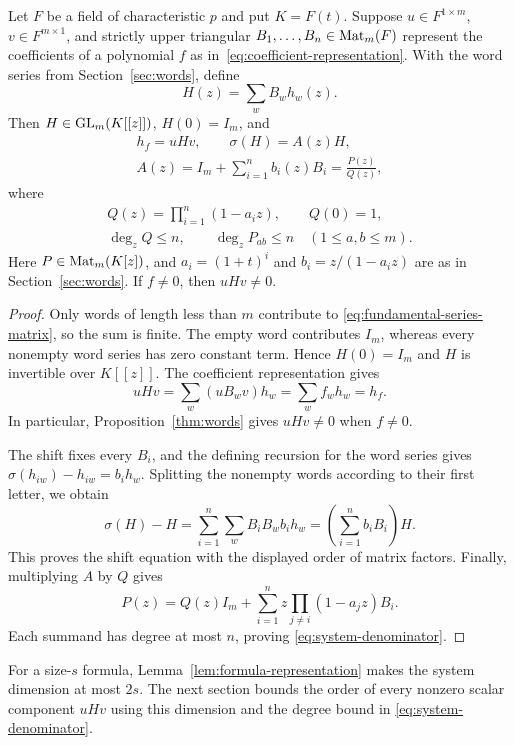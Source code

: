 \begin{proposition}
\label{prop:formula-system}
Let $F$ be a field of characteristic $p$ and put $K=F(t)$.
Suppose $u\in F^{1\times m}$, $v\in F^{m\times 1}$, and strictly upper triangular
$B_1,\ldots,B_n\in\operatorname{Mat}_m(F)$ represent the coefficients of a polynomial $f$
as in~\eqref{eq:coefficient-representation}.  With the word series from
Section~\ref{sec:words}, define
\begin{equation}
\label{eq:fundamental-series-matrix}
 H(z)=\sum_w B_w h_w(z).
\end{equation}
Then $H\in\operatorname{GL}_m(K[[z]])$, $H(0)=I_m$, and
\begin{equation}
\label{eq:formula-shift-system}
 \begin{gathered}
 h_f=uHv,\qquad \sigma(H)=A(z)H,\\
 A(z)=I_m+\sum_{i=1}^n b_i(z)B_i=\frac{P(z)}{Q(z)},
 \end{gathered}
\end{equation}
where
\begin{equation}
\label{eq:system-denominator}
 \begin{gathered}
 Q(z)=\prod_{i=1}^n(1-a_i z),\qquad Q(0)=1,\\
 \deg_z Q\leq n,\qquad \deg_z P_{ab}\leq n
 \quad(1\leq a,b\leq m).
 \end{gathered}
\end{equation}
Here $P\in\operatorname{Mat}_m(K[z])$, and $a_i=(1+t)^i$ and
$b_i=z/(1-a_i z)$ are as in Section~\ref{sec:words}.
If $f\neq 0$, then $uHv\neq 0$.
\end{proposition}

\begin{proof}
Only words of length less than $m$ contribute to
\eqref{eq:fundamental-series-matrix}, so the sum is finite.
The empty word contributes $I_m$, whereas every nonempty word series has
zero constant term.  Hence $H(0)=I_m$ and $H$ is invertible over $K[[z]]$.
The coefficient representation gives
\[
 uHv=\sum_w (uB_wv)h_w=\sum_w f_w h_w=h_f.
\]
In particular, Proposition~\ref{thm:words} gives $uHv\neq 0$ when $f\neq 0$.

The shift fixes every $B_i$, and the defining recursion for the word series
gives $\sigma(h_{iw})-h_{iw}=b_i h_w$.  Splitting the nonempty words according
to their first letter, we obtain
\[
 \sigma(H)-H
 =\sum_{i=1}^n\sum_w B_iB_w b_i h_w
 =\left(\sum_{i=1}^n b_i B_i\right)H.
\]
This proves the shift equation with the displayed order of matrix factors.
Finally, multiplying $A$ by $Q$ gives
\[
 P(z)=Q(z)I_m+
       \sum_{i=1}^n z\prod_{j\neq i}(1-a_j z)B_i.
\]
Each summand has degree at most $n$, proving
\eqref{eq:system-denominator}.
\end{proof}

For a size-$s$ formula, Lemma~\ref{lem:formula-representation} makes the
system dimension at most $2s$.  The next section bounds the order of every
nonzero scalar component $uHv$ using this dimension and the degree bound in
\eqref{eq:system-denominator}.
